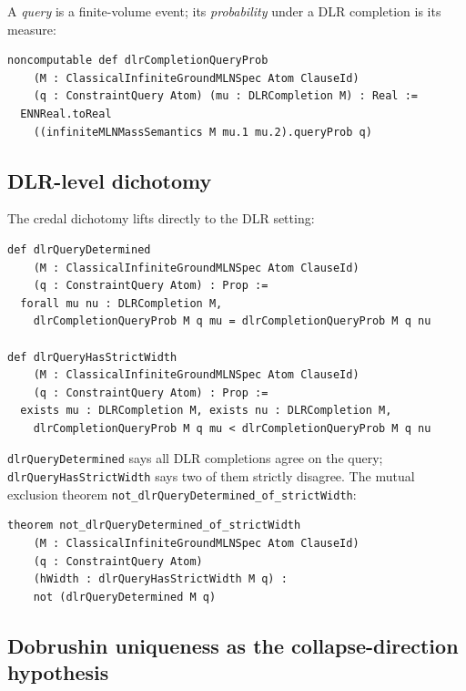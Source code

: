 \documentclass[]{article}
\newcommand{\lid}[1]{{\ttfamily\nolinkurl{#1}}}
\begin{document}
A \emph{query} is a finite-volume event; its \emph{probability} under a
DLR completion is its measure:
\begin{lstlisting}
noncomputable def dlrCompletionQueryProb
    (M : ClassicalInfiniteGroundMLNSpec Atom ClauseId)
    (q : ConstraintQuery Atom) (mu : DLRCompletion M) : Real :=
  ENNReal.toReal
    ((infiniteMLNMassSemantics M mu.1 mu.2).queryProb q)
\end{lstlisting}

\subsection{DLR-level dichotomy}\label{sec:dlrdichotomy}

The credal dichotomy lifts directly to the DLR setting:
\begin{lstlisting}
def dlrQueryDetermined
    (M : ClassicalInfiniteGroundMLNSpec Atom ClauseId)
    (q : ConstraintQuery Atom) : Prop :=
  forall mu nu : DLRCompletion M,
    dlrCompletionQueryProb M q mu = dlrCompletionQueryProb M q nu

def dlrQueryHasStrictWidth
    (M : ClassicalInfiniteGroundMLNSpec Atom ClauseId)
    (q : ConstraintQuery Atom) : Prop :=
  exists mu : DLRCompletion M, exists nu : DLRCompletion M,
    dlrCompletionQueryProb M q mu < dlrCompletionQueryProb M q nu
\end{lstlisting}
\lid{dlrQueryDetermined} says all DLR completions agree on the query;
\lid{dlrQueryHasStrictWidth} says two of them strictly disagree. The
mutual exclusion theorem
\lid{not\_dlrQueryDetermined\_of\_strictWidth}:
\begin{lstlisting}
theorem not_dlrQueryDetermined_of_strictWidth
    (M : ClassicalInfiniteGroundMLNSpec Atom ClauseId)
    (q : ConstraintQuery Atom)
    (hWidth : dlrQueryHasStrictWidth M q) :
    not (dlrQueryDetermined M q)
\end{lstlisting}

\subsection{Dobrushin uniqueness as the collapse-direction hypothesis}
\end{document}
